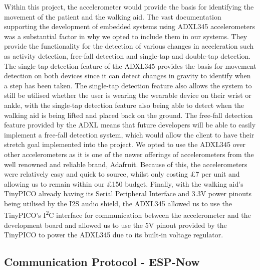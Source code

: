                     Within this project, the accelerometer would provide the basis for identifying the movement of the patient and the walking aid. The vast documentation supporting the development of embedded systems using ADXL345 accelerometers was a substantial factor in why we opted to include them in our systems. They provide the functionality for the detection of various changes in acceleration such as activity detection, free-fall detection and single-tap and double-tap detection. The single-tap detection feature of the ADXL345 provides the basis for movement detection on both devices since it can detect changes in gravity to identify when a step has been taken. The single-tap detection feature also allows the system to still be utilised whether the user is wearing the wearable device on their wrist or ankle, with the single-tap detection feature also being able to detect when the walking aid is being lifted and placed back on the ground. The free-fall detection feature provided by the ADXL means that future developers will be able to easily implement a free-fall detection system, which would allow the client to have their stretch goal implemented into the project. We opted to use the ADXL345 over other accelerometers as it is one of the newer offerings of accelerometers from the well renowned and reliable brand, Adafruit. Because of this, the accelerometers were relatively easy and quick to source, whilst only costing £7 per unit and allowing us to remain within our £150 budget. Finally, with the walking aid's TinyPICO already having its Serial Peripheral Interface and 3.3V power pinouts being utilised by the I2S audio shield, the ADXL345 allowed us to use the TinyPICO's I\textsuperscript{2}C interface for communication between the accelerometer and the development board and allowed us to use the 5V pinout provided by the TinyPICO to power the ADXL345 due to its built-in voltage regulator.
        
                \subsection{Communication Protocol - ESP-Now}
                \label{subsec:esp_now_comms}
        
